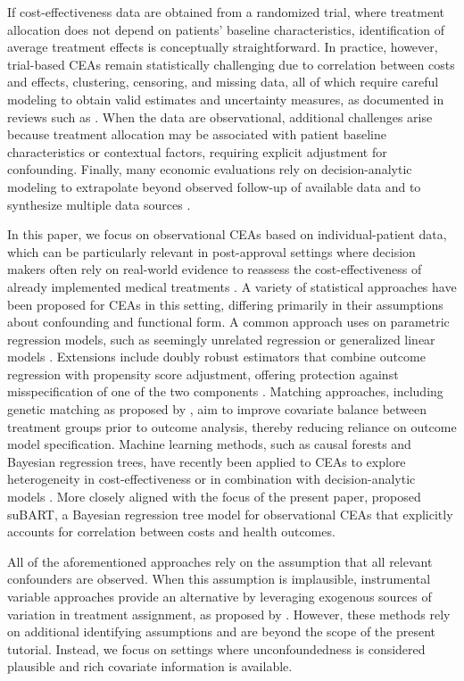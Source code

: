 \documentclass[aoas,preprint]{imsart}
\theoremstyle{plain}
\theoremstyle{definition}
\theoremstyle{remark}
\theoremstyle{remark}
\begin{document}
If cost-effectiveness data are obtained from a randomized trial, where treatment allocation does not depend on patients’ baseline characteristics, identification of average treatment effects is conceptually straightforward. In practice, however, trial-based CEAs remain statistically challenging due to correlation between costs and effects, clustering, censoring, and missing data, all of which require careful modeling to obtain valid estimates and uncertainty measures, as documented in reviews such as \citet{el2022scoping}. When the data are observational, additional challenges arise because treatment allocation may be associated with patient baseline characteristics or contextual factors, requiring explicit adjustment for confounding. Finally, many economic evaluations rely on decision-analytic modeling to extrapolate beyond observed follow-up of available data and to synthesize multiple data sources \citep{Sculpher2006}.

In this paper, we focus on observational CEAs based on individual-patient data, which can be particularly relevant in post-approval settings where decision makers often rely on real-world evidence to reassess the cost-effectiveness of already implemented medical treatments \citep{Sculpher2006}. A variety of statistical approaches have been proposed for CEAs in this setting, differing primarily in their assumptions about confounding and functional form. A common approach uses on parametric regression models, such as seemingly unrelated regression or generalized linear models \citep{kreif2013statistical}. Extensions include doubly robust estimators that combine outcome regression with propensity score adjustment, offering protection against misspecification of one of the two components \citep{kreif2013regression}.
Matching approaches, including genetic matching as proposed by \citet{SekhonGrieve2011}, aim to improve covariate balance between treatment groups prior to outcome analysis, thereby reducing reliance on outcome model specification. 
Machine learning methods, such as causal forests and Bayesian regression trees, have recently been applied to CEAs to explore heterogeneity in cost-effectiveness or in combination with decision-analytic models \citep{bonander2021using,Glynn2024}. More closely aligned with the focus of the present paper, \citet{esser2025seemingly} proposed suBART, a Bayesian regression tree model for observational CEAs that explicitly accounts for correlation between costs and health outcomes.

All of the aforementioned approaches rely on the assumption that all relevant confounders are observed. When this assumption is implausible, instrumental variable approaches provide an alternative by leveraging exogenous sources of variation in treatment assignment, as proposed by \citet{MolerZapata2022}. However, these methods rely on additional identifying assumptions and are beyond the scope of the present tutorial. Instead, we focus on settings where unconfoundedness is considered plausible and rich covariate information is available.
\end{document}
